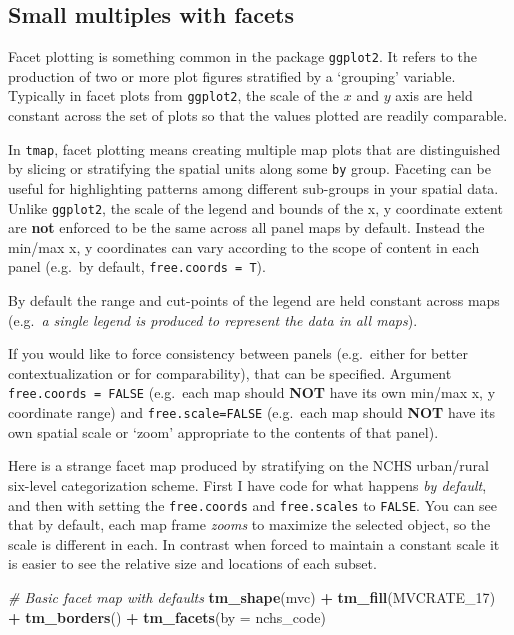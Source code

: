 \documentclass[
]{book}
\newenvironment{Shaded}{\begin{snugshade}}{\end{snugshade}}
\newcommand{\AttributeTok}[1]{\textcolor[rgb]{0.13,0.29,0.53}{#1}}
\newcommand{\CommentTok}[1]{\textcolor[rgb]{0.56,0.35,0.01}{\textit{#1}}}
\newcommand{\FunctionTok}[1]{\textcolor[rgb]{0.13,0.29,0.53}{\textbf{#1}}}
\newcommand{\NormalTok}[1]{#1}
\newcommand{\SpecialCharTok}[1]{\textcolor[rgb]{0.81,0.36,0.00}{\textbf{#1}}}
\newcommand{\StringTok}[1]{\textcolor[rgb]{0.31,0.60,0.02}{#1}}
\begin{document}
\hypertarget{tmap-facet}{%
\subsection{Small multiples with facets}\label{tmap-facet}}

Facet plotting is something common in the package \texttt{ggplot2}. It refers to the production of two or more plot figures stratified by a `grouping' variable. Typically in facet plots from \texttt{ggplot2}, the scale of the \(x\) and \(y\) axis are held constant across the set of plots so that the values plotted are readily comparable.

In \texttt{tmap}, facet plotting means creating multiple map plots that are distinguished by slicing or stratifying the spatial units along some \texttt{by} group. Faceting can be useful for highlighting patterns among different sub-groups in your spatial data. Unlike \texttt{ggplot2}, the scale of the legend and bounds of the x, y coordinate extent are \textbf{not} enforced to be the same across all panel maps by default. Instead the min/max x, y coordinates can vary according to the scope of content in each panel (e.g.~by default, \texttt{free.coords\ =\ T}).

By default the range and cut-points of the legend are held constant across maps (e.g.~\emph{a single legend is produced to represent the data in all maps}).

If you would like to force consistency between panels (e.g.~either for better contextualization or for comparability), that can be specified. Argument \texttt{free.coords\ =\ FALSE} (e.g.~each map should \textbf{NOT} have its own min/max x, y coordinate range) and \texttt{free.scale=FALSE} (e.g.~each map should \textbf{NOT} have its own spatial scale or `zoom' appropriate to the contents of that panel).

Here is a strange facet map produced by stratifying on the NCHS urban/rural six-level categorization scheme. First I have code for what happens \emph{by default}, and then with setting the \texttt{free.coords} and \texttt{free.scales} to \texttt{FALSE}. You can see that by default, each map frame \emph{zooms} to maximize the selected object, so the scale is different in each. In contrast when forced to maintain a constant scale it is easier to see the relative size and locations of each subset.

\begin{Shaded}
\begin{Highlighting}[]
\CommentTok{\# Basic facet map with defaults}
\FunctionTok{tm\_shape}\NormalTok{(mvc) }\SpecialCharTok{+}
  \FunctionTok{tm\_fill}\NormalTok{(}\StringTok{\textquotesingle{}MVCRATE\_17\textquotesingle{}}\NormalTok{) }\SpecialCharTok{+}
  \FunctionTok{tm\_borders}\NormalTok{() }\SpecialCharTok{+}
  \FunctionTok{tm\_facets}\NormalTok{(}\AttributeTok{by =} \StringTok{\textquotesingle{}nchs\_code\textquotesingle{}}\NormalTok{)}
\end{Highlighting}
\end{Shaded}
\end{document}
